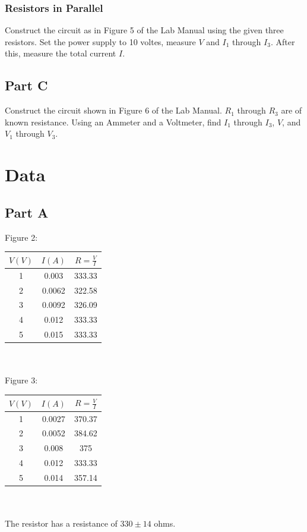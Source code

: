 \documentclass[titlepage]{article}
\begin{document}
\subsubsection{Resistors in Parallel}\label{ssub:resistors_in_parallel-proc}
Construct the circuit as in Figure 5 of the Lab Manual using the given three resistors. Set the power supply to 10 voltes, measure $V$ and $I_1$ through $I_3$. After this, measure the total current $I$.

\subsection{Part C}\label{sub:part_c-proc}
Construct the circuit shown in Figure 6 of the Lab Manual. $R_1$ through $R_3$ are of known resistance. Using an Ammeter and a Voltmeter, find $I_1$ through $I_3$, $V$, and $V_1$ through $V_3$.

\section{Data}\label{sec:data}

\subsection{Part A}\label{sub:part_a-data}
Figure 2:
\begin{tabular}{ccc}
\hline
$V (V)$ & $I (A)$ & $R = \frac{V}{I}$\\
\hline
1 & 0.003 & 333.33\\
\hline
2 & 0.0062 & 322.58\\
\hline
3 & 0.0092 & 326.09\\
\hline
4 & 0.012 & 333.33\\
\hline
5 & 0.015 & 333.33\\
\hline
\end{tabular}
\\
\\
Figure 3:
\begin{tabular}{ccc}
\hline
$V (V)$ & $I (A)$ & $R = \frac{V}{I}$\\
\hline
1 & 0.0027 & 370.37\\
\hline
2 & 0.0052 & 384.62\\
\hline
3 & 0.008 & 375\\
\hline
4 & 0.012 & 333.33\\
\hline
5 & 0.014 & 357.14\\
\hline
\end{tabular}
\\
\\
The resistor has a resistance of $330 \pm 14$ ohms.
\end{document}
